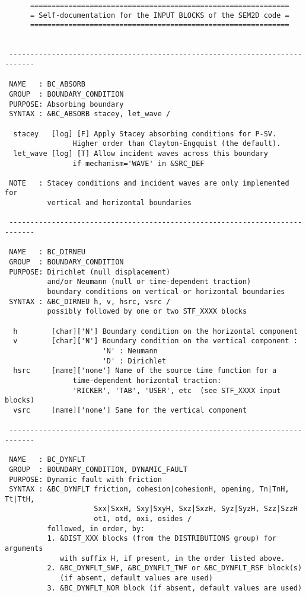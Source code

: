 \begin{verbatim}
      =============================================================
      = Self-documentation for the INPUT BLOCKS of the SEM2D code =
      =============================================================
 
 
 ----------------------------------------------------------------------------

 NAME   : BC_ABSORB
 GROUP  : BOUNDARY_CONDITION
 PURPOSE: Absorbing boundary
 SYNTAX : &BC_ABSORB stacey, let_wave /

  stacey   [log] [F] Apply Stacey absorbing conditions for P-SV.
                Higher order than Clayton-Engquist (the default).
  let_wave [log] [T] Allow incident waves across this boundary 
                if mechanism='WAVE' in &SRC_DEF

 NOTE   : Stacey conditions and incident waves are only implemented for 
          vertical and horizontal boundaries

 ----------------------------------------------------------------------------

 NAME   : BC_DIRNEU
 GROUP  : BOUNDARY_CONDITION
 PURPOSE: Dirichlet (null displacement) 
          and/or Neumann (null or time-dependent traction) 
          boundary conditions on vertical or horizontal boundaries
 SYNTAX : &BC_DIRNEU h, v, hsrc, vsrc /
          possibly followed by one or two STF_XXXX blocks

  h        [char]['N'] Boundary condition on the horizontal component
  v        [char]['N'] Boundary condition on the vertical component :
                       'N' : Neumann 
                       'D' : Dirichlet
  hsrc     [name]['none'] Name of the source time function for a
                time-dependent horizontal traction: 
                'RICKER', 'TAB', 'USER', etc  (see STF_XXXX input blocks)
  vsrc     [name]['none'] Same for the vertical component

 ----------------------------------------------------------------------------

 NAME   : BC_DYNFLT
 GROUP  : BOUNDARY_CONDITION, DYNAMIC_FAULT
 PURPOSE: Dynamic fault with friction
 SYNTAX : &BC_DYNFLT friction, cohesion|cohesionH, opening, Tn|TnH, Tt|TtH,
                     Sxx|SxxH, Sxy|SxyH, Sxz|SxzH, Syz|SyzH, Szz|SzzH
                     ot1, otd, oxi, osides /
          followed, in order, by:
          1. &DIST_XXX blocks (from the DISTRIBUTIONS group) for arguments
             with suffix H, if present, in the order listed above.
          2. &BC_DYNFLT_SWF, &BC_DYNFLT_TWF or &BC_DYNFLT_RSF block(s) 
             (if absent, default values are used)
          3. &BC_DYNFLT_NOR block (if absent, default values are used)


\end{verbatim}
